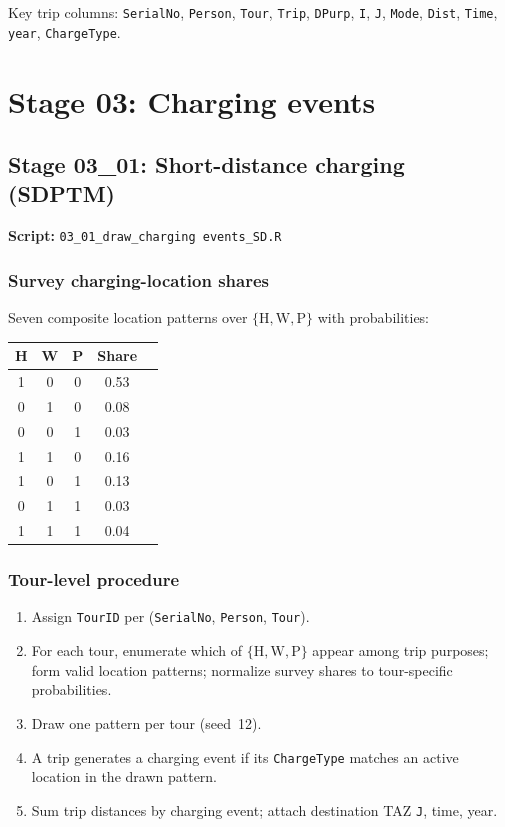 \documentclass[11pt,a4paper]{article}
\begin{document}
Key trip columns: \texttt{SerialNo}, \texttt{Person}, \texttt{Tour}, \texttt{Trip}, \texttt{DPurp}, \texttt{I}, \texttt{J}, \texttt{Mode}, \texttt{Dist}, \texttt{Time}, \texttt{year}, \texttt{ChargeType}.

\section{Stage 03: Charging events}

\subsection{Stage 03\_01: Short-distance charging (SDPTM)}
\textbf{Script:} \texttt{03\_01\_draw\_charging events\_SD.R}

\subsubsection{Survey charging-location shares}
Seven composite location patterns over $\{\text{H},\text{W},\text{P}\}$ with probabilities:
\begin{center}
\begin{tabular}{cccc|c}
\toprule
H & W & P & Share \\
\midrule
1&0&0 & 0.53 \\
0&1&0 & 0.08 \\
0&0&1 & 0.03 \\
1&1&0 & 0.16 \\
1&0&1 & 0.13 \\
0&1&1 & 0.03 \\
1&1&1 & 0.04 \\
\bottomrule
\end{tabular}
\end{center}

\subsubsection{Tour-level procedure}
\begin{enumerate}[noitemsep]
  \item Assign \texttt{TourID} per (\texttt{SerialNo}, \texttt{Person}, \texttt{Tour}).
  \item For each tour, enumerate which of $\{\text{H},\text{W},\text{P}\}$ appear among trip purposes; form valid location patterns; normalize survey shares to tour-specific probabilities.
  \item Draw one pattern per tour (seed~12).
  \item A trip generates a charging event if its \texttt{ChargeType} matches an active location in the drawn pattern.
  \item Sum trip distances by charging event; attach destination TAZ \texttt{J}, time, year.
\end{enumerate}
\end{document}
